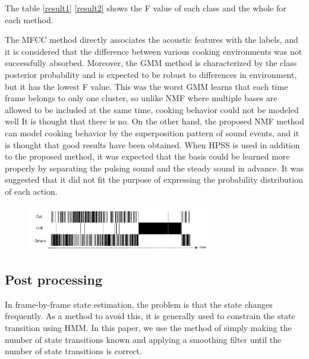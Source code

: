 \documentclass[sigconf]{acmart}
\begin{document}
The table \ref{result1} \ref{result2} shows the F value of each class and the whole for each method.

The MFCC method directly associates the acoustic features with the labels, and it is considered that the difference between various cooking environments was not successfully absorbed.
Moreover, the GMM method is characterized by the class posterior probability and is expected to be robust to differences in environment, but it has the lowest F value. This was the worst%
GMM learns that each time frame belongs to only one cluster, so unlike NMF where multiple bases are allowed to be included at the same time, cooking behavior could not be modeled well It is thought that there is no.
On the other hand, the proposed NMF method can model cooking behavior by the superposition pattern of sound events, and it is thought that good results have been obtained.
When HPSS is used in addition to the proposed method, it was expected that the basis could be learned more properly by separating the pulsing sound and the steady sound in advance. It was suggested that it did not fit the purpose of expressing the probability distribution of each action.

\begin{figure}[t]
  \centering
  \includegraphics[width=8cm]{fig/N63_m4.pdf}
  \caption{}
  \Description{}
  \label{baseine_timeline_result}
\end{figure}

\subsection{Post processing}

In frame-by-frame state estimation, the problem is that the state changes frequently. As a method to avoid this, it is generally used to constrain the state transition using HMM.
In this paper, we use the method of simply making the number of state transitions known and applying a smoothing filter until the number of state transitions is correct.
\end{document}
